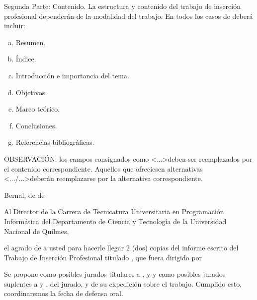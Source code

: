 Segunda Parte: Contenido.
La estructura y contenido del trabajo de inserción profesional dependerán de la
modalidad del trabajo. En todos los casos de deberá incluir:
\begin{enumerate}[a.]
\item Resumen.
\item Índice.
\item Introducción e importancia del tema.
\item Objetivos.
\item Marco teórico.
\item Conclusiones.
\item Referencias bibliográficas.
\end{enumerate}

\newpage
{}

OBSERVACIÓN: los campos consignados como \textless...\textgreater deben ser
reemplazados por el contenido correspondiente. Aquellos que ofreciesen
alternativas \textless.../...\textgreater deberán reemplazarse por la alternativa correspondiente.
\begin{flushright}
Bernal,  de  de 
\end{flushright}

Al Director de la Carrera de Tecnicatura Universitaria en Programación Informática del
Departamento de Ciencia y Tecnología de la
Universidad Nacional de Quilmes,


\hrulefill

 el agrado de  a
usted para hacerle llegar 2 (dos) copias del informe escrito del Trabajo de Inserción
Profesional titulado , que
fuera dirigido por 

Se propone como posibles jurados titulares a , 
y  y como posibles jurados
suplentes a  y .
del jurado, y de su expedición sobre el trabajo. Cumplido esto, coordinaremos la fecha
de defensa oral.

